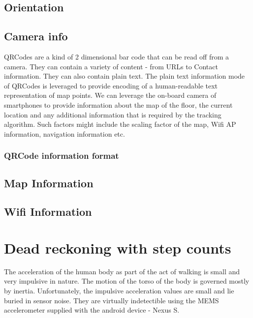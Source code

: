 \subsection{Orientation}


\subsection{Camera info\label{sec:QRCodes}}
QRCodes are a kind of 2 dimensional bar code
that can be read off from a camera. They can contain a variety of content - 
from URLs to Contact information. They can also contain plain text. The 
plain text information mode of QRCodes is leveraged to provide encoding 
of a human-readable text representation of map points. We can leverage 
the on-board camera of smartphones to provide information about the map 
of the floor, the current location and any additional information that is 
required by the tracking algorithm. Such factors might include the scaling 
factor of the map, Wifi AP information, navigation information etc.

\subsubsection{QRCode information format}



\subsection{Map Information}


\subsection{Wifi Information}



\section{Dead reckoning with step counts}

The acceleration of the human body as part of the act of walking is small and 
very impulsive in nature. The motion of the torso of the body is governed 
mostly by inertia. Unfortunately, the impulsive acceleration values are small 
and lie buried in sensor noise. They are virtually indetectible using the MEMS 
accelerometer supplied with the android device - Nexus S.

